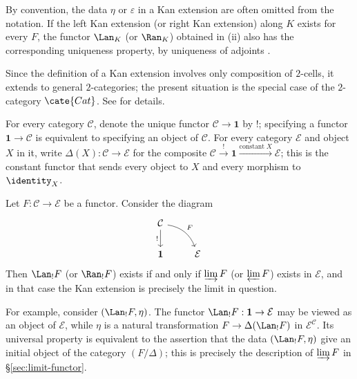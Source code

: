 By convention, the data $\eta$ or $\varepsilon$ in a Kan extension are often
omitted from the notation. If the left Kan extension (or right Kan extension)
along $K$ exists for every $F$, the functor $\Lan_K$ (or $\Ran_K$) obtained
in (ii) also has the corresponding uniqueness property, by uniqueness of
adjoints \cite[Proposition 2.6.10]{Li1}.

\begin{remark}
	Since the definition of a Kan extension involves only composition of
	$2$-cells, it extends to general $2$-categories; the present situation is
	the special case of the $2$-category $\cate{Cat}$. See
	\cite[\S 3.5]{Li1} for details.
\end{remark}

For every category $\mathcal{C}$, denote the unique functor
$\mathcal{C} \to \mathbf{1}$ by $!$; specifying a functor
$\mathbf{1} \to \mathcal{C}$ is equivalent to specifying an object of
$\mathcal{C}$. For every category $\mathcal{E}$ and object $X$ in it, write
$\Delta(X): \mathcal{C} \to \mathcal{E}$ for the composite
$\mathcal{C} \xrightarrow{!} \mathbf{1} \xrightarrow{\text{constant}\; X}
\mathcal{E}$; this is the constant functor that sends every object to $X$ and
every morphism to $\identity_X$.

\begin{example}\label{eg:limit-as-Kan}
	Let $F: \mathcal{C} \to \mathcal{E}$ be a functor. Consider the diagram
	\[\begin{tikzcd}
		\mathcal{C} \arrow[d, "!"'] \arrow[rd, bend left, "F"] & \\
		\mathbf{1} & \mathcal{E}
	\end{tikzcd}\]
	Then $\Lan_! F$ (or $\Ran_! F$) exists if and only if $\varinjlim F$ (or
	$\varprojlim F$) exists in $\mathcal{E}$, and in that case the Kan
	extension is precisely the limit in question.

	For example, consider $(\Lan_! F, \eta)$. The functor
	$\Lan_! F: \mathbf{1} \to \mathcal{E}$ may be viewed as an object of
	$\mathcal{E}$, while $\eta$ is a natural transformation
	$F \to \Delta(\Lan_! F)$ in $\mathcal{E}^{\mathcal{C}}$. Its universal
	property is equivalent to the assertion that the data $(\Lan_! F, \eta)$
	give an initial object of the category $(F/\Delta)$; this is precisely the
	description of $\varinjlim F$ in \S\ref{sec:limit-functor}.
\end{example}

